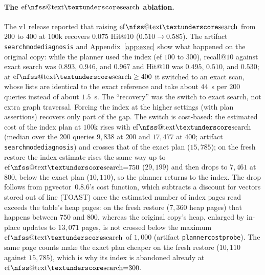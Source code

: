 \documentclass{ieeeaccess}
\makeatletter
\DeclareRobustCommand{\_}{\ifmmode\nfss@text{\textunderscore}\else\textunderscore\allowbreak\fi}
\makeatother
\begin{document}
\paragraph{The $\mathrm{ef\_search}$ ablation.}
The v1 release reported that raising $\mathrm{ef\_search}$ from $200$ to $400$ at $100\text{k}$ recovers $0.075$ Hit@10 ($0.510{\to}0.585$). The artifact \texttt{search\_mode\_diagnosis\_5434} and Appendix~\ref{app:exec} show what happened on the original copy: while the planner used the index (ef $100$ to $300$), recall$@10$ against exact search was $0.893$, $0.946$, and $0.967$ and Hit@10 was $0.495$, $0.510$, and $0.530$; at $\mathrm{ef\_search}\ge400$ it switched to an exact scan, whose lists are identical to the exact reference and take about $44$~s per $200$ queries instead of about $1.5$~s. The ``recovery'' was the switch to exact search, not extra graph traversal. Forcing the index at the higher settings (with plan assertions) recovers only part of the gap. The switch is cost-based: the estimated cost of the index plan at $100\text{k}$ rises with $\mathrm{ef\_search}$ (median over the $200$ queries $9{,}838$ at $200$ and $17{,}477$ at $400$; artifact \texttt{search\_mode\_diagnosis\_5434}) and crosses that of the exact plan ($15{,}785$); on the fresh restore the index estimate rises the same way up to $\mathrm{ef\_search}{=}750$ ($29{,}199$) and then drops to $7{,}461$ at $800$, below the exact plan ($10{,}110$), so the planner returns to the index. The drop follows from pgvector~0.8.6's cost function, which subtracts a discount for vectors stored out of line (TOAST) once the estimated number of index pages read exceeds the table's heap pages: on the fresh restore ($7{,}360$ heap pages) that happens between $750$ and $800$, whereas the original copy's heap, enlarged by in-place updates to $13{,}071$ pages, is not crossed below the maximum $\mathrm{ef\_search}$ of $1{,}000$ (artifact \texttt{planner\_cost\_probe}). The same page counts make the exact plan cheaper on the fresh restore ($10{,}110$ against $15{,}785$), which is why its index is abandoned already at $\mathrm{ef\_search}{=}300$.
\end{document}
